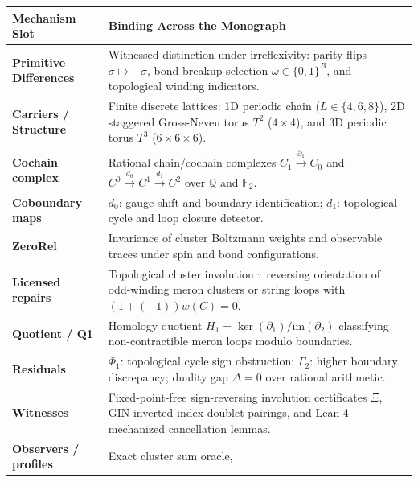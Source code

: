 \documentclass[
  11pt,
]{article}
\begin{document}
\begin{longtable}[]{@{}
  >{\raggedright\arraybackslash}p{}
  >{\raggedright\arraybackslash}p{}@{}}
\toprule\noalign{}
\begin{minipage}[b]{\linewidth}\raggedright
Mechanism Slot
\end{minipage} & \begin{minipage}[b]{\linewidth}\raggedright
Binding Across the Monograph
\end{minipage} \\
\midrule\noalign{}
\endhead
\bottomrule\noalign{}
\endlastfoot
\textbf{Primitive Differences} & Witnessed distinction under
irreflexivity: parity flips \(\sigma \mapsto -\sigma\), bond breakup
selection \(\omega \in \{0, 1\}^B\), and topological winding
indicators. \\
\textbf{Carriers / Structure} & Finite discrete lattices: 1D periodic
chain (\(L \in \{4, 6, 8\}\)), 2D staggered Gross-Neveu torus \(T^2\)
(\(4 \times 4\)), and 3D periodic torus \(T^3\)
(\(6 \times 6 \times 6\)). \\
\textbf{Cochain complex} & Rational chain/cochain complexes
\(C_1 \xrightarrow{\partial_1} C_0\) and
\(C^0 \xrightarrow{d_0} C^1 \xrightarrow{d_1} C^2\) over \(\mathbb{Q}\)
and \(\mathbb{F}_2\). \\
\textbf{Coboundary maps} & \(d_0\): gauge shift and boundary
identification; \(d_1\): topological cycle and loop closure detector. \\
\textbf{ZeroRel} & Invariance of cluster Boltzmann weights and
observable traces under spin and bond configurations. \\
\textbf{Licensed repairs} & Topological cluster involution \(\tau\)
reversing orientation of odd-winding meron clusters or string loops with
\((1 + (-1)) w(C) = 0\). \\
\textbf{Quotient / Q1} & Homology quotient
\(H_1 = \ker(\partial_1)/\mathrm{im}(\partial_2)\) classifying
non-contractible meron loops modulo boundaries. \\
\textbf{Residuals} & \(\Phi_1\): topological cycle sign obstruction;
\(\Gamma_2\): higher boundary discrepancy; duality gap \(\Delta = 0\)
over rational arithmetic. \\
\textbf{Witnesses} & Fixed-point-free sign-reversing involution
certificates \(\Xi\), GIN inverted index doublet pairings, and Lean 4
mechanized cancellation lemmas. \\
\textbf{Observers / profiles} & Exact cluster sum oracle,

\end{longtable}
\end{document}
